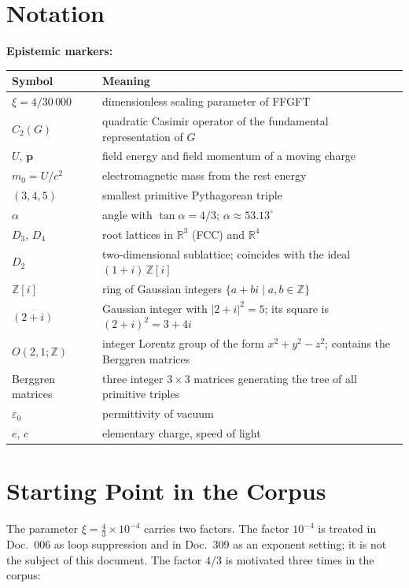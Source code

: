 \section*{Notation}

\medskip
\textbf{Epistemic markers:}\par\medskip


\medskip
\begin{tabular}{@{}lp{10.5cm}@{}}
\toprule
\textbf{Symbol} & \textbf{Meaning} \\
\midrule
$\xi=4/30\,000$ & dimensionless scaling parameter of FFGFT \\
$C_2(G)$ & quadratic Casimir operator of the fundamental representation of $G$ \\
$U$, $\mathbf p$ & field energy and field momentum of a moving charge \\
$m_0 = U/c^2$ & electromagnetic mass from the rest energy \\
$(3,4,5)$ & smallest primitive Pythagorean triple \\
$\alpha$ & angle with $\tan\alpha = 4/3$; $\alpha \approx 53.13^\circ$ \\
$D_3$, $D_4$ & root lattices in $\mathbb R^3$ (FCC) and $\mathbb R^4$ \\
$D_2$       & two-dimensional sublattice; coincides with the ideal $(1+i)\,\mathbb Z[i]$ \\
$\mathbb Z[i]$ & ring of Gaussian integers $\{a+bi \mid a,b\in\mathbb Z\}$ \\
$(2+i)$     & Gaussian integer with $|2+i|^2 = 5$; its square is $(2+i)^2 = 3+4i$ \\
$O(2,1;\mathbb Z)$ & integer Lorentz group of the form $x^2+y^2-z^2$; contains the Berggren matrices \\
Berggren matrices & three integer $3\times3$ matrices generating the tree of all primitive triples \\
$\varepsilon_0$ & permittivity of vacuum \\
$e$, $c$    & elementary charge, speed of light \\
\bottomrule
\end{tabular}

\section{Starting Point in the Corpus}
\label{sec:ausgang}

The parameter $\xi = \tfrac{4}{3}\times10^{-4}$ carries two factors. The factor
$10^{-4}$ is treated in Doc.~006 as loop suppression and in Doc.~309 as an
exponent setting; it is not the subject of this document. The factor $4/3$ is
motivated three times in the corpus:


